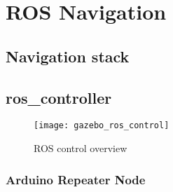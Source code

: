 \chapter{ROS Navigation}

\section{Navigation stack}

\section{ros\_controller}
\begin{figure}[h]
	\caption{ROS control overview}
	\texttt{[image: gazebo\_ros\_control]}
	\label{fig:ros_controller}
	
\end{figure}

\subsection{Arduino Repeater Node}
